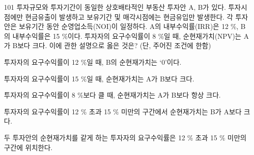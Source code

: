\begin{question}{101}
투자규모와 투자기간이 동일한 상호배타적인 부동산 투자안 A, B가 있다. 투자시점에만 현금유출이 발생하고 보유기간 및 매각시점에는 현금유입만 발생한다. 각 투자안은 보유기간 동안 순영업소득(NOI)이 일정하다. A의 내부수익률(IRR)은 12 \%, B의 내부수익률은 15 \%이다. 투자자의 요구수익률이 8 \%일 때, 순현재가치(NPV)는 A가 B보다 크다. 이에 관한 설명으로 옳은 것은? (단, 주어진 조건에 한함)
\begin{choices}
  \item 투자자의 요구수익률이 12 \%일 때, B의 순현재가치는 ‘0’이다.
  \item 투자자의 요구수익률이 15 \%일 때, 순현재가치는 A가 B보다 크다.
  \item 투자자의 요구수익률이 8 \%보다 클 때, 순현재가치는 A가 B보다 항상 크다.
  \item 투자자의 요구수익률이 12 \% 초과 15 \% 미만의 구간에서 순현재가치는 B가 A보다 크다.
  \item 두 투자안의 순현재가치를 같게 하는 투자자의 요구수익률은 12 \% 초과 15 \% 미만의 구간에 위치한다.
\end{choices}
\end{question}
